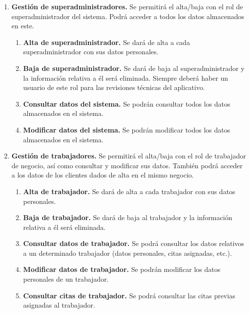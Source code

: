 \begin{enumerate}[leftmargin=1.75cm,start=1,label={\bfseries RF-\arabic*.}]
\setlength\itemsep{1em} %
    \item \textbf{Gestión de superadministradores.} Se permitirá el alta/baja con el rol de superadministrador del
    sistema. Podrá acceder a todos los datos almacenados en este.
    \begin{enumerate}[start=1,label={\bfseries RF-1.\arabic*.}]
        \item \textbf{Alta de superadministrador.} Se dará de alta a cada superadministrador con sus datos personales.
        \item \textbf{Baja de superadministrador.} Se dará de baja al superadministrador y la información relativa a
        él será eliminada. Siempre deberá haber un usuario de este rol para las revisiones técnicas del aplicativo.
        \item \textbf{Consultar datos del sistema.} Se podrán consultar todos los datos almacenados en el sistema.
        \item \textbf{Modificar datos del sistema.} Se podrán modificar todos los datos almacenados en el sistema.
    \end{enumerate}

    \item \textbf{Gestión de trabajadores.} Se permitirá el alta/baja con el rol de trabajador de negocio,
    así como consultar y modificar sus datos. También podrá acceder a los datos de los clientes dados de alta
    en el mismo negocio.
    \begin{enumerate}[start=1,label={\bfseries RF-2.\arabic*.}]
        \item \textbf{Alta de trabajador.} Se dará de alta a cada trabajador con sus datos personales.
        \item \textbf{Baja de trabajador.} Se dará de baja al trabajador y la información relativa a él será eliminada.
        \item \textbf{Consultar datos de trabajador.} Se podrá consultar los datos relativos a un determinado
        trabajador (datos personales, citas asignadas, etc.).
        \item \textbf{Modificar datos de trabajador.} Se podrán modificar los datos personales de un
        trabajador.
        \item \textbf{Consultar citas de trabajador.} Se podrá consultar las citas previas asignadas al trabajador.
    \end{enumerate}


\end{enumerate}
